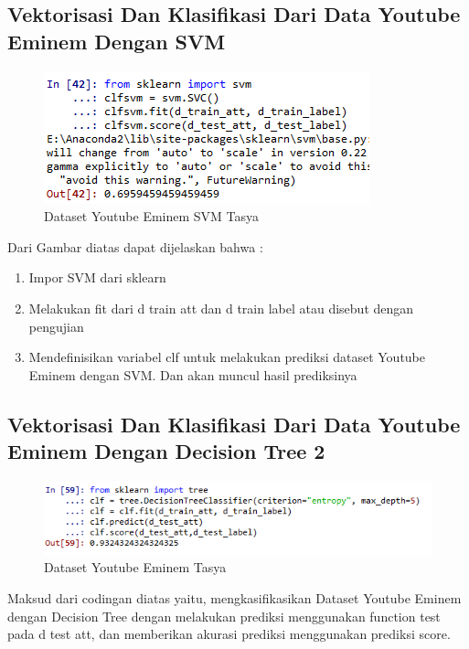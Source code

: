 \subsection{Vektorisasi Dan Klasifikasi Dari Data Youtube Eminem Dengan SVM}
\begin{figure}[ht]
\centering
\includegraphics[scale=0.5]{figures/praktektasya8.png}
\caption{Dataset Youtube Eminem SVM Tasya}
\label{Praktek}
\end{figure}
Dari Gambar diatas dapat dijelaskan bahwa :
\begin{enumerate}
\item Impor SVM dari sklearn
\item Melakukan fit dari d train att dan d train label atau disebut dengan pengujian
\item Mendefinisikan variabel clf untuk melakukan prediksi dataset Youtube Eminem dengan SVM. Dan akan muncul hasil prediksinya
\end{enumerate}

\subsection{Vektorisasi Dan Klasifikasi Dari Data Youtube Eminem Dengan Decision Tree 2}
\begin{figure}[ht]
\centering
\includegraphics[scale=0.5]{figures/praktektasya9.png}
\caption{Dataset Youtube Eminem Tasya}
\label{Praktek}
\end{figure}
Maksud dari codingan diatas yaitu, mengkasifikasikan Dataset Youtube Eminem dengan Decision Tree dengan melakukan prediksi menggunakan function test pada d test att, dan memberikan akurasi prediksi menggunakan prediksi score.

